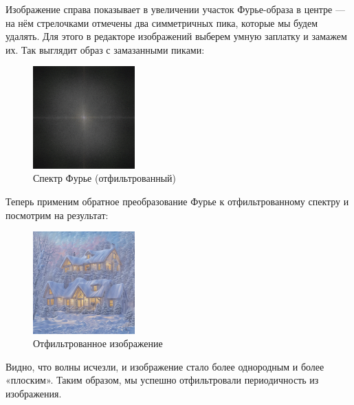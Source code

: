 \documentclass[a4paper]{article}
\begin{document}
Изображение справа показывает в увеличении участок Фурье-образа в центре --- на нём стрелочками отмечены два симметричных пика, которые мы будем удалять. Для этого в редакторе изображений выберем умную заплатку и замажем их.\newpage
Так выглядит образ с замазанными пиками:
\begin{figure}[H]
    \centering\includegraphics[width=0.35\textwidth]{sources/1first/11_fft_edited.png}
    \caption{Спектр Фурье (отфильтрованный)}
\end{figure}
Теперь применим обратное преобразование Фурье к отфильтрованному спектру и посмотрим на результат:
\begin{figure}[H]
    \centering\includegraphics[width=0.35\textwidth]{sources/1first/11_filtered.png}
    \caption{Отфильтрованное изображение}
\end{figure}
Видно, что волны исчезли, и изображение стало более однородным и более «плоским». Таким образом, мы успешно отфильтровали периодичность из изображения.\newpage
\end{document}
